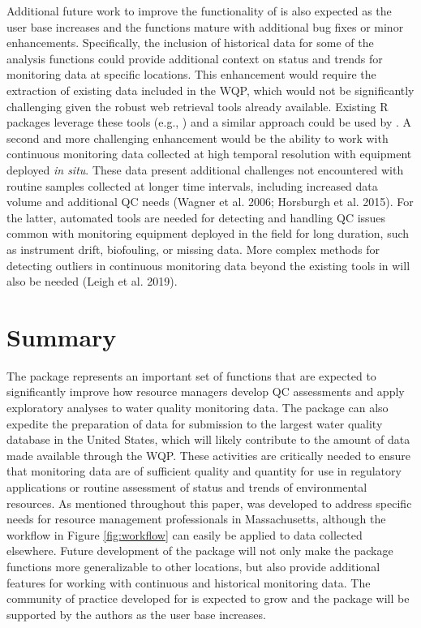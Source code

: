 Additional future work to improve the functionality of  is also expected as the user base increases and the functions mature with additional bug fixes or minor enhancements. Specifically, the inclusion of historical data for some of the analysis functions could provide additional context on status and trends for monitoring data at specific locations. This enhancement would require the extraction of existing data included in the WQP, which would not be significantly challenging given the robust web retrieval tools already available. Existing R packages leverage these tools (e.g., ) and a similar approach could be used by . A second and more challenging enhancement would be the ability to work with continuous monitoring data collected at high temporal resolution with equipment deployed \emph{in situ}. These data present additional challenges not encountered with routine samples collected at longer time intervals, including increased data volume and additional QC needs (Wagner et al. 2006; Horsburgh et al. 2015). For the latter, automated tools are needed for detecting and handling QC issues common with monitoring equipment deployed in the field for long duration, such as instrument drift, biofouling, or missing data. More complex methods for detecting outliers in continuous monitoring data beyond the existing tools in  will also be needed (Leigh et al. 2019).

\hypertarget{summary}{%
\section{Summary}\label{summary}}

The  package represents an important set of functions that are expected to significantly improve how resource managers develop QC assessments and apply exploratory analyses to water quality monitoring data. The package can also expedite the preparation of data for submission to the largest water quality database in the United States, which will likely contribute to the amount of data made available through the WQP. These activities are critically needed to ensure that monitoring data are of sufficient quality and quantity for use in regulatory applications or routine assessment of status and trends of environmental resources. As mentioned throughout this paper,  was developed to address specific needs for resource management professionals in Massachusetts, although the workflow in Figure \ref{fig:workflow} can easily be applied to data collected elsewhere. Future development of the package will not only make the package functions more generalizable to other locations, but also provide additional features for working with continuous and historical monitoring data. The community of practice developed for  is expected to grow and the package will be supported by the authors as the user base increases.

